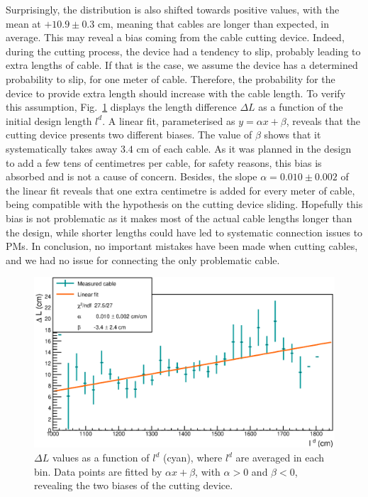 Surprisingly, the distribution is also shifted towards positive values, with the mean at $+10.9\pm 0.3$ cm, meaning that cables are longer than expected, in average.
This may reveal a bias coming from the cable cutting device.
Indeed, during the cutting process, the device had a tendency to slip, probably leading to extra lengths of cable.
If that is the case, we assume the device has a determined probability to slip, for one meter of cable.
Therefore, the probability for the device to provide extra length should increase with the cable length.
To verify this assumption, Fig.~\ref{fig:CutBias} displays the length difference $\Delta L$ as a function of the initial design length $l^{d}$.
A linear fit, parameterised as $y = \alpha x + \beta$, reveals that the cutting device presents two different biases.
The value of $\beta$ shows that it systematically takes away $3.4$ cm of each cable.
As it was planned in the design to add a few tens of centimetres per cable, for safety reasons, this bias is absorbed and is not a cause of concern.
Besides, the slope $\alpha = 0.010\pm 0.002$ of the linear fit reveals that one extra centimetre is added for every meter of cable, being compatible with the hypothesis on the cutting device sliding.
Hopefully this bias is not problematic as it makes most of the actual cable lengths longer than the design, while shorter lengths could have led to systematic connection issues to PMs.
In conclusion, no important mistakes have been made when cutting cables, and we had no issue for connecting the only problematic cable.
\begin{figure}[h!]
  \centering
  \includegraphics[width=15cm]{commissioning/fig_commissioning/cut_biais.eps}
  \caption{$\Delta L$ values as a function of $l^{d}$ (cyan), where $l^{d}$ are averaged in each bin.
    Data points are fitted by $\alpha x + \beta$, with $\alpha > 0$ and $\beta < 0$, revealing the two biases of the cutting device.
    \label{fig:CutBias}}
\end{figure}

